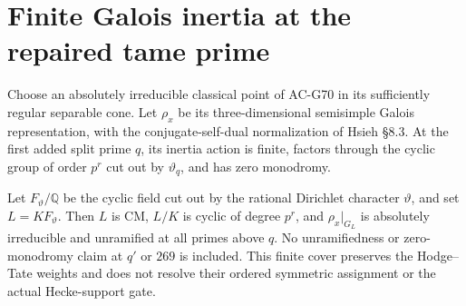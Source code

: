 \section{Finite Galois inertia at the repaired tame prime}
\label{sec:cubic-hsieh-tame-inertia}

\begin{corollary}
\label{AC-G70-inertia}
Choose an absolutely irreducible classical point of AC-G70
in its sufficiently regular separable cone.  Let $\rho_x$
be its three-dimensional semisimple Galois representation,
with the conjugate-self-dual normalization of Hsieh \S8.3.
At the first added split prime $q$, its inertia action is
finite, factors through the cyclic group of order $p^r$
cut out by $\vartheta_q$, and has zero monodromy.

Let $F_\vartheta/\mathbb Q$ be the cyclic field cut out by
the rational Dirichlet character $\vartheta$, and set
$L=KF_\vartheta$.  Then $L$ is CM, $L/K$ is cyclic of
degree $p^r$, and $\rho_x|_{G_L}$ is absolutely irreducible
and unramified at all primes above $q$.
No unramifiedness or zero-monodromy claim at $q'$ or $269$
is included.  This finite cover preserves the Hodge--Tate
weights and does not resolve their ordered symmetric
assignment or the actual Hecke-support gate.
\end{corollary}
